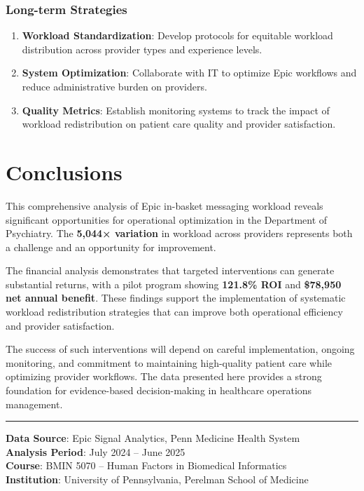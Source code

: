\documentclass[
  11pt,
]{article}
\begin{document}
\subsubsection{Long-term Strategies}\label{long-term-strategies}

\begin{enumerate}
\def\labelenumi{\arabic{enumi}.}
\item
  \textbf{Workload Standardization}: Develop protocols for equitable
  workload distribution across provider types and experience levels.
\item
  \textbf{System Optimization}: Collaborate with IT to optimize Epic
  workflows and reduce administrative burden on providers.
\item
  \textbf{Quality Metrics}: Establish monitoring systems to track the
  impact of workload redistribution on patient care quality and provider
  satisfaction.
\end{enumerate}

\section{Conclusions}\label{conclusions}

This comprehensive analysis of Epic in-basket messaging workload reveals
significant opportunities for operational optimization in the Department
of Psychiatry. The \textbf{5,044× variation} in workload across
providers represents both a challenge and an opportunity for
improvement.

The financial analysis demonstrates that targeted interventions can
generate substantial returns, with a pilot program showing
\textbf{121.8\% ROI} and \textbf{\$78,950 net annual benefit}. These
findings support the implementation of systematic workload
redistribution strategies that can improve both operational efficiency
and provider satisfaction.

The success of such interventions will depend on careful implementation,
ongoing monitoring, and commitment to maintaining high-quality patient
care while optimizing provider workflows. The data presented here
provides a strong foundation for evidence-based decision-making in
healthcare operations management.

\begin{center}\rule{0.5\linewidth}{0.5pt}\end{center}

\textbf{Data Source}: Epic Signal Analytics, Penn Medicine Health
System\\
\textbf{Analysis Period}: July 2024 -- June 2025\\
\textbf{Course}: BMIN 5070 -- Human Factors in Biomedical Informatics\\
\textbf{Institution}: University of Pennsylvania, Perelman School of
Medicine
\end{document}
